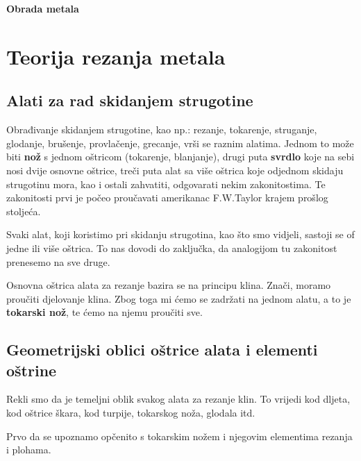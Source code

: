 \documentclass[a4paper,12pt]{article}
\numberwithin{figure}{section}
\begin{document}
\begin{titlepage}
\begin{titlepage}
  

  \begin{center}

  {\huge\bfseries Obrada metala}
  \vskip 2cm
  
  \end{center}

\end{titlepage}
\end{titlepage}

\section{Teorija rezanja metala}
\subsection{Alati za rad skidanjem strugotine}
Obrađivanje skidanjem strugotine, kao np.: rezanje, tokarenje, struganje, glodanje, brušenje, provlačenje, grecanje, vrši se raznim alatima. Jednom to može biti \textbf{nož} s jednom oštricom (tokarenje, blanjanje), drugi puta \textbf{svrdlo} koje na sebi nosi dvije osnovne oštrice, treči puta alat sa više oštrica koje odjednom skidaju strugotinu mora, kao i ostali zahvatiti, odgovarati nekim zakonitostima. Te zakonitosti prvi je počeo proučavati amerikanac F.W.Taylor krajem prošlog stoljeća.\par
Svaki alat, koji koristimo pri skidanju strugotina, kao što smo vidjeli, sastoji se of jedne ili više oštrica. To nas dovodi do zaključka, da analogijom tu zakonitost prenesemo na sve druge.\par
Osnovna oštrica alata za rezanje bazira se na principu klina. Znači, moramo proučiti djelovanje klina. Zbog toga mi ćemo se zadržati na jednom alatu, a to je \textbf{tokarski nož}, te ćemo na njemu proučiti sve.
\subsection{Geometrijski oblici oštrice alata i elementi oštrine}
Rekli smo da je temeljni oblik svakog alata za rezanje klin. To vrijedi kod dljeta, kod oštrice škara, kod turpije, tokarskog noža, glodala itd. \par
Prvo da se upoznamo opčenito s tokarskim nožem i njegovim elementima rezanja i plohama.
\end{document}
